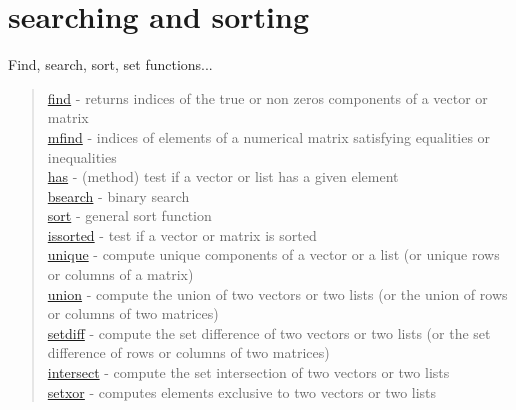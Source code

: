 \chapter*{searching and sorting}
\hypertarget{searchandsort}{}
Find, search, sort, set functions...

\begin{quote}
\noindent
\hyperlink{find}{find} - returns indices of the true or non zeros
components of a vector or matrix \\
\hyperlink{mfind}{mfind} - indices of elements of a numerical matrix satisfying equalities or inequalities\\
\hyperlink{has}{has} - (method) test if a vector or list has a given element\\
\hyperlink{bsearch}{bsearch} - binary search \\
\hyperlink{sort}{sort} - general sort function \\
\hyperlink{issorted}{issorted} - test if a vector or matrix is sorted \\
\hyperlink{unique}{unique} - compute unique components of a vector or a list (or unique rows or columns of a matrix) \\
\hyperlink{union}{union} - compute the union of two vectors or two lists (or the union of rows or columns of two matrices) \\
\hyperlink{setdiff}{setdiff} - compute the set difference of two vectors or two lists (or the set difference of rows or columns of two matrices) \\
\hyperlink{intersect}{intersect} - compute the set intersection of two vectors or two lists\\
\hyperlink{setxor}{setxor} - computes elements exclusive to two vectors or two lists\\
\end{quote}

 
 
 
 
 

 
 
 
  
 
